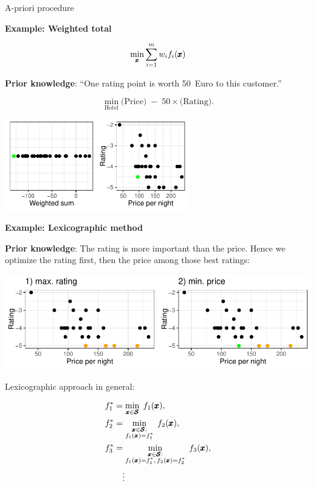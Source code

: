 \documentclass[11pt,compress,t,notes=noshow,xcolor=table]{beamer}
\newcommand{\yy}{\cost}    %
\begin{document}
\begin{vbframe}{A-priori procedure}

\textbf{Example: Weighted total}

$$ \min_{\pmb{x}} \sum_{i=1}^m w_i f_i(\pmb{x}) $$

\textbf{Prior knowledge}: 
``One rating point is worth 50~Euro to this customer.'' 

\[
\min_{\text{Hotel}} \text{(Price)} \;-\; 50 \times \text{(Rating)}.
\]
\vspace{-0.2cm}
\begin{center}
\includegraphics[width=0.6\textwidth]{figure_man/expedia-9-1.pdf}
\end{center}


\framebreak

\textbf{Example: Lexicographic method}

\textbf{Prior knowledge}: The rating is more important than the price. 
Hence we optimize the rating first, then the price among those best ratings:

\begin{center}
\includegraphics[width=1\textwidth]{figure_man/expedia-10-1.pdf}
\end{center}

\framebreak
\vspace{-0.3cm}
Lexicographic approach in general:

{\small
\[
\begin{aligned}
\yy_1^* &= \min_{\conf \in \pcs} \;\cost_1(\conf),\\
\yy_2^* &= \min_{\substack{\conf \in \pcs:\\ \cost_1(\conf)=\yy_1^*}} \;\cost_2(\conf),\\
\yy_3^* &= \min_{\substack{\conf \in \pcs:\\ \cost_1(\conf)=\yy_1^*,\,\cost_2(\conf)=\yy_2^*}} 
          \;\cost_3(\conf),\\
&\quad\vdots
\end{aligned}
\]
}


\end{vbframe}
\end{document}
